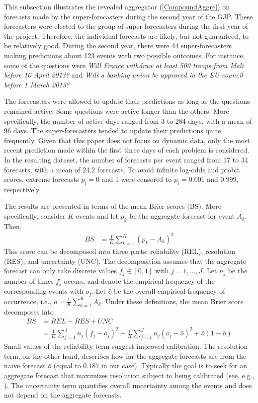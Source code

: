 \documentclass[12pt]{article}
\theoremstyle{definition}
\theoremstyle{definition}
\begin{document}
This subsection illustrates the revealed aggregator (\ref{CompoundAggre})
on forecasts made by the super-forecasters during the second year of the GJP. These forecasters were
elected to the group of super-forecasters during the first year of the project. 
Therefore, the individual forecasts are
likely, but not guaranteed, to be relatively good. During the second year, there were 44 super-forecasters making predictions about 123 events with two possible outcomes. For instance, some of
the questions were \textit{Will France withdraw at least 500 troops from Mali before 10 April 2013?} and \textit{Will a banking union be approved in the EU council before 1 March 2013?}

 The forecasters were allowed to update their predictions as long as the
questions remained active. Some questions were active longer than the
others. More specifically, the number of active days ranged from 3 to 284 days,
with a mean of 96 days. The super-forecasters tended to update their predictions quite frequently. Given that this paper does not focus on dynamic
data, only the most recent prediction made within the first three days of each problem is considered.  
In the resulting
dataset, the number of forecasts per event ranged from 17 to 34
forecasts, with a mean of 24.2 forecasts. To avoid infinite log-odds
and probit scores, extreme forecasts $p_i = 0$ and $1$ were
censored to $p_i = 0.001$ and $0.999$, respectively.
 
 
The results are presented in terms of the mean Brier scores (BS). More specifically, consider $K$
events and let $p_k$ be the aggregate forecast for event $A_k$. Then,
 \begin{align*}
BS &= \frac{1}{K} \sum_{k=1}^K (p_k - A_k)^2
 \end{align*}
 This score can be decomposed into three parts: reliability (REL),
resolution (RES), and uncertainty (UNC). The decomposition assumes
that the aggregate forecast can only take discrete values $f_j \in
[0,1]$ with $j = 1, \dots, J$. Let $n_j$ be the number of times $f_j$
occurs, and denote the empirical frequency of the corresponding events
with $o_j$.  Let $\bar{o}$ be the overall empirical frequency of
occurrence, i.e., $\bar{o} = \frac{1}{K} \sum_{k=1}^K A_k$. Under these definitions, the
mean Brier score decomposes into
 \begin{align*}
BS &= REL - RES + UNC\\
&= \frac{1}{K} \sum_{j=1}^J n_j (f_j - o_j)^2 - \frac{1}{K} \sum_{j=1}^J n_j (o_j - \bar{o})^2 + \bar{o}(1-\bar{o})
 \end{align*}
 Small values of the reliability term suggest improved
calibration. The resolution term, on the other hand, describes how far
the aggregate forecasts are from the naive forecast $\bar{o}$ (equal to $0.187$ in our case). Typically the goal is
to seek for an aggregate forecast that maximizes resolution subject to
being calibrated (see, e.g., \citealt{gneiting2007probabilistic}). The
uncertainty term quantifies overall uncertainty among the events and
does not depend on the aggregate forecasts.
 
\end{document}
